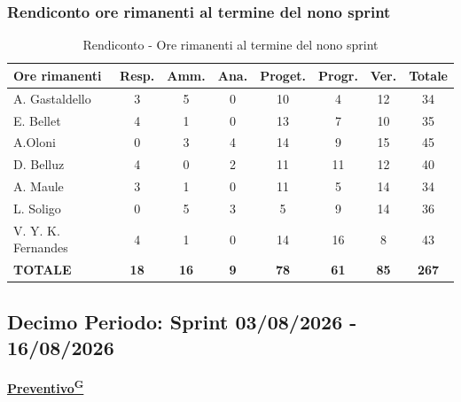 \documentclass[a4paper,12pt]{article}
\providecommand{\glslink}[2]{\href{https://alittlebyte-19.github.io/Documentazione/glossario.html\#gls-#1}{\underline{#2}\textsuperscript{\scriptsize G}}}
\begin{document}
\subsubsection{Rendiconto ore rimanenti al termine del nono sprint}
\begin{table}[htbp]
\centering
\renewcommand{\arraystretch}{1.5}
\begin{tabularx}{\textwidth}{|X|c|c|c|c|c|c|c|}
\hline
\textbf{Ore rimanenti} & \textbf{Resp.} & \textbf{Amm.} & \textbf{Ana.} & \textbf{Proget.} & \textbf{Progr.} & \textbf{Ver.} & \textbf{Totale} \\
\hline
A. Gastaldello & 3 & 5 & 0 & 10 & 4 & 12 & 34 \\
\hline
E. Bellet & 4 & 1 & 0 & 13 & 7 & 10 & 35 \\
\hline
A.Oloni & 0 & 3 & 4 & 14 & 9 & 15 & 45 \\
\hline
D. Belluz & 4 & 0 & 2 & 11 & 11 & 12 & 40 \\
\hline
A. Maule & 3 & 1 & 0 & 11 & 5 & 14 & 34 \\
\hline
L. Soligo & 0 & 5 & 3 & 5 & 9 & 14 & 36 \\
\hline
V. Y. K. Fernandes & 4 & 1 & 0 & 14 & 16 & 8 & 43 \\
\hline
\rowcolor{gray!20}
\textbf{TOTALE} & \textbf{18} & \textbf{16} & \textbf{9} & \textbf{78} & \textbf{61} & \textbf{85} & \textbf{267} \\
\hline
\end{tabularx}
\caption{Rendiconto - Ore rimanenti al termine del nono sprint}
\end{table}

\newpage
\subsection {Decimo Periodo: Sprint 03/08/2026 - 16/08/2026}

\label{sec:pec_decimoperiodo}

\vspace{0.5em}

\begin{center}
\noindent\textbf{\glslink{preventivo}{Preventivo}}
\end{center}
\end{document}
